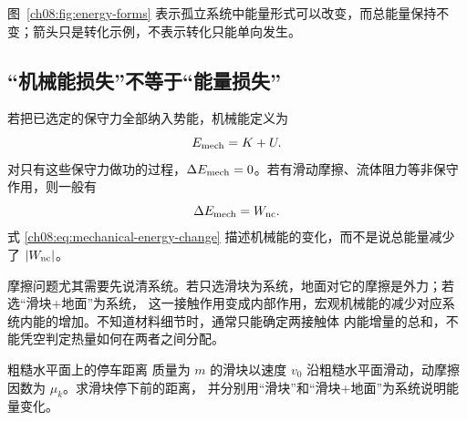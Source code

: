 {图~\ref{ch08:fig:energy-forms} 表示孤立系统中能量形式可以改变，而总能量保持不变；箭头只是转化示例，不表示转化只能单向发生。
\begin{center}\begin{minipage}{.98\linewidth}\centering
{}
\par{}
\label{ch08:fig:energy-forms}
\end{minipage}\end{center}

\subsection{“机械能损失”不等于“能量损失”}

若把已选定的保守力全部纳入势能，机械能定义为
\[
  E_{\rm mech}=K+U.
\]
对只有这些保守力做功的过程，$\Delta E_{\rm mech}=0$。若有滑动摩擦、流体阻力等非保守作用，则一般有
\begin{equation}
  \Delta E_{\rm mech}=W_{\rm nc}.
  \label{ch08:eq:mechanical-energy-change}
\end{equation}
式 \eqref{ch08:eq:mechanical-energy-change} 描述机械能的变化，而不是说总能量减少了 $|W_{\rm nc}|$。

摩擦问题尤其需要先说清系统。若只选滑块为系统，地面对它的摩擦是外力；若选“滑块+地面”为系统，
这一接触作用变成内部作用，宏观机械能的减少对应系统内能的增加。不知道材料细节时，通常只能确定两接触体
内能增量的总和，不能凭空判定热量如何在两者之间分配。

\begin{origexamplebox}{粗糙水平面上的停车距离}\label{ch08:ex:s13-4-21}
质量为 $m$ 的滑块以速度 $v_0$ 沿粗糙水平面滑动，动摩擦因数为 $\mu_k$。求滑块停下前的距离，
并分别用“滑块”和“滑块+地面”为系统说明能量变化。


\end{origexamplebox}}
